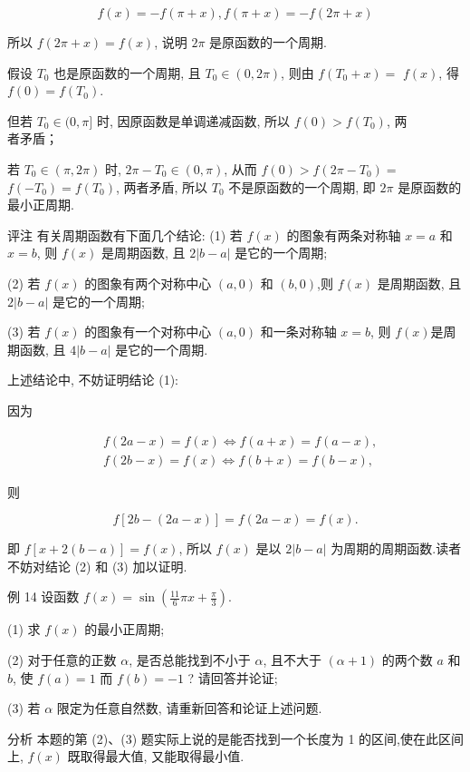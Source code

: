 	$$
		f(x)=-f(\pi+x), f(\pi+x)=-f(2 \pi+x)
	$$

	所以 $f(2 \pi+x)=f(x)$, 说明 $2 \pi$ 是原函数的一个周期.

	假设 $T_{0}$ 也是原函数的一个周期, 且 $T_{0} \in(0,2 \pi)$, 则由 $f\left(T_{0}+x\right)=$ $f(x)$, 得 $f(0)=f\left(T_{0}\right)$.

	但若 $T_{0} \in(0, \pi]$ 时, 因原函数是单调递减函数, 所以 $f(0)>f\left(T_{0}\right)$, 两\\
	者矛盾；

	若 $T_{0} \in(\pi, 2 \pi)$ 时, $2 \pi-T_{0} \in(0, \pi)$, 从而 $f(0)>f\left(2 \pi-T_{0}\right)=$ $f\left(-T_{0}\right)=f\left(T_{0}\right)$, 两者矛盾, 所以 $T_{0}$ 不是原函数的一个周期, 即 $2 \pi$ 是原函数的最小正周期.

	评注 有关周期函数有下面几个结论: (1) 若 $f(x)$ 的图象有两条对称轴 $x=a$ 和 $x=b$, 则 $f(x)$ 是周期函数, 且 $2|b-a|$ 是它的一个周期;

	(2) 若 $f(x)$ 的图象有两个对称中心 $(a, 0)$ 和 $(b, 0)$,则 $f(x)$ 是周期函数, 且 $2|b-a|$ 是它的一个周期;

	(3) 若 $f(x)$ 的图象有一个对称中心 $(a, 0)$ 和一条对称轴 $x=b$, 则 $f(x)$是周期函数, 且 $4|b-a|$ 是它的一个周期.

	上述结论中, 不妨证明结论 (1):

	因为

	$$
		\begin{aligned}
			 & f(2 a-x)=f(x) \Leftrightarrow f(a+x)=f(a-x), \\
			 & f(2 b-x)=f(x) \Leftrightarrow f(b+x)=f(b-x),
		\end{aligned}
	$$

	则

	$$
		f[2 b-(2 a-x)]=f(2 a-x)=f(x) .
	$$

	即 $f[x+2(b-a)]=f(x)$, 所以 $f(x)$ 是以 $2|b-a|$ 为周期的周期函数.读者不妨对结论 (2) 和 (3) 加以证明.

	例 14 设函数 $f(x)=\sin \left(\frac{11}{6} \pi x+\frac{\pi}{3}\right)$.

	(1) 求 $f(x)$ 的最小正周期;

	(2) 对于任意的正数 $\alpha$, 是否总能找到不小于 $\alpha$, 且不大于 $(\alpha+1)$ 的两个数 $a$ 和 $b$, 使 $f(a)=1$ 而 $f(b)=-1$ ? 请回答并论证;

	(3) 若 $\alpha$ 限定为任意自然数, 请重新回答和论证上述问题.

	分析 本题的第 (2)、(3) 题实际上说的是能否找到一个长度为 1 的区间,使在此区间上, $f(x)$ 既取得最大值, 又能取得最小值.

